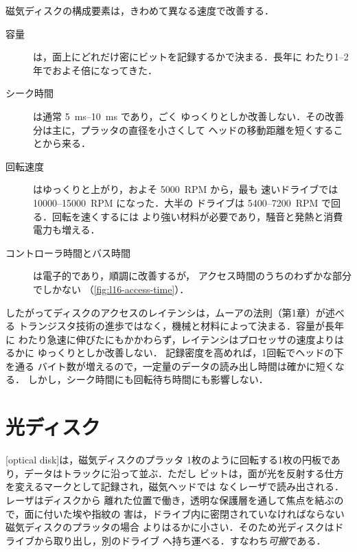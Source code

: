 \documentclass[../main.tex]{subfiles}
\begin{document}
磁気ディスクの構成要素は，きわめて異なる速度で改善する．
\begin{description}
  \item[容量] は，面上にどれだけ密にビットを記録するかで決まる．長年に
    わたり1--2年でおよそ倍になってきた．%
  \item[シーク時間] は通常 \SIrange[range-phrase={--}, range-units=single]{5}{10}{\milli\second} であり，ごく
    ゆっくりとしか改善しない．その改善分は主に，プラッタの直径を小さくして
    ヘッドの移動距離を短くすることから来る．
  \item[回転速度] はゆっくりと上がり，およそ \num{5000}~RPM から，最も
    速いドライブでは \num{10000}--\num{15000}~RPM になった．大半の
    ドライブは \num{5400}--\num{7200}~RPM で回る．回転を速くするには
    より強い材料が必要であり，騒音と発熱と消費電力も増える．
  \item[コントローラ時間とバス時間] は電子的であり，順調に改善するが，
    アクセス時間のうちのわずかな部分でしかない
    （\cref{fig:l16-access-time}）．
\end{description}

したがってディスクのアクセスのレイテンシは，ムーアの法則（第1章）が述べる
トランジスタ技術の進歩ではなく，機械と材料によって決まる．容量が長年に
わたり急速に伸びたにもかかわらず，レイテンシはプロセッサの速度よりはるかに
ゆっくりとしか改善しない．
記録密度を高めれば，1回転でヘッドの下を通る
バイト数が増えるので，一定量のデータの読み出し時間は確かに短くなる．
しかし，シーク時間にも回転待ち時間にも影響しない．

\section{光ディスク}
\label{sec:l16-optical}

[optical disk]は，磁気ディスクのプラッタ
1枚のように回転する1枚の円板であり，データはトラックに沿って並ぶ．ただし
ビットは，面が光を反射する仕方を変えるマークとして記録され，磁気ヘッドでは
なくレーザで読み出される．レーザはディスクから
離れた位置で働き，透明な保護層を通して焦点を結ぶので，面に付いた埃や指紋の
害は，ドライブ内に密閉されていなければならない磁気ディスクのプラッタの場合
よりはるかに小さい．そのため光ディスクはドライブから取り出し，別のドライブ
へ持ち運べる．すなわち\emph{可搬}である．
\end{document}
